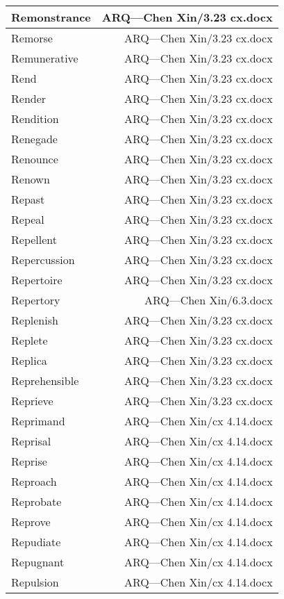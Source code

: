\documentclass{article}
\begin{document}
\begin{center}
\begin{longtable}{|l|r|}
\hline
Remonstrance  &  ARQ---Chen Xin/3.23 cx.docx\\  
\hline
Remorse  &  ARQ---Chen Xin/3.23 cx.docx\\  
\hline
Remunerative  &  ARQ---Chen Xin/3.23 cx.docx\\  
\hline
Rend  &  ARQ---Chen Xin/3.23 cx.docx\\  
\hline
Render  &  ARQ---Chen Xin/3.23 cx.docx\\  
\hline
Rendition  &  ARQ---Chen Xin/3.23 cx.docx\\  
\hline
Renegade  &  ARQ---Chen Xin/3.23 cx.docx\\  
\hline
Renounce  &  ARQ---Chen Xin/3.23 cx.docx\\  
\hline
Renown  &  ARQ---Chen Xin/3.23 cx.docx\\  
\hline
Repast  &  ARQ---Chen Xin/3.23 cx.docx\\  
\hline
Repeal  &  ARQ---Chen Xin/3.23 cx.docx\\  
\hline
Repellent  &  ARQ---Chen Xin/3.23 cx.docx\\  
\hline
Repercussion  &  ARQ---Chen Xin/3.23 cx.docx\\  
\hline
Repertoire  &  ARQ---Chen Xin/3.23 cx.docx\\  
\hline
Repertory  &  ARQ---Chen Xin/6.3.docx\\  
\hline
Replenish  &  ARQ---Chen Xin/3.23 cx.docx\\  
\hline
Replete  &  ARQ---Chen Xin/3.23 cx.docx\\  
\hline
Replica  &  ARQ---Chen Xin/3.23 cx.docx\\  
\hline
Reprehensible  &  ARQ---Chen Xin/3.23 cx.docx\\  
\hline
Reprieve  &  ARQ---Chen Xin/3.23 cx.docx\\  
\hline
Reprimand  &  ARQ---Chen Xin/cx 4.14.docx\\  
\hline
Reprisal  &  ARQ---Chen Xin/cx 4.14.docx\\  
\hline
Reprise  &  ARQ---Chen Xin/cx 4.14.docx\\  
\hline
Reproach  &  ARQ---Chen Xin/cx 4.14.docx\\  
\hline
Reprobate  &  ARQ---Chen Xin/cx 4.14.docx\\  
\hline
Reprove  &  ARQ---Chen Xin/cx 4.14.docx\\  
\hline
Repudiate  &  ARQ---Chen Xin/cx 4.14.docx\\  
\hline
Repugnant  &  ARQ---Chen Xin/cx 4.14.docx\\  
\hline
Repulsion  &  ARQ---Chen Xin/cx 4.14.docx\\  

\end{longtable}
\end{center}
\end{document}
